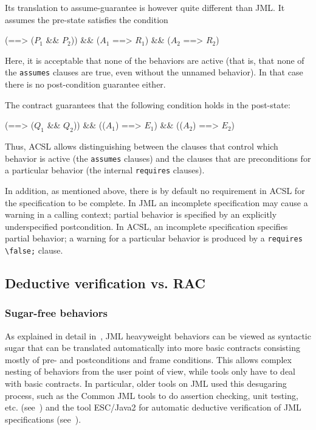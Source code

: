 \noindent
Its translation to assume-guarantee is however quite different than JML.
It assumes the pre-state satisfies the condition

\begin{listing-nonumber}
  (\true ==> ($P_1$ && $P_2$)) && ($A_1$ ==> $R_1$) && ($A_2$ ==> $R_2$)
\end{listing-nonumber}
Here, it is acceptable that none of the behaviors are active (that is, that none of the \lstinline|assumes| clauses are true, even without the unnamed behavior). In that case there is no post-condition guarantee either.

The contract guarantees that the following condition holds in the post-state:

\begin{listing-nonumber}
(\true ==> ($Q_1$ && $Q_2$)) && (\old($A_1$) ==> $E_1$) && (\old($A_2$) ==> $E_2$)
\end{listing-nonumber}

Thus, ACSL allows distinguishing between the clauses that control
which behavior is active (the \lstinline|assumes| clauses) and the
clauses that are preconditions for a particular behavior (the internal
\lstinline|requires| clauses). 

In addition, as mentioned above, there is
by default no requirement in ACSL for the specification to be complete. In JML an incomplete specification may cause a warning in a calling context; partial behavior is specified by an explicitly underspecified postcondition. In ACSL, an incomplete specification specifies partial behavior; a warning for a particular behavior is produced by a \lstinline|requires \false;| clause.

\subsection{Deductive verification vs. RAC}

\subsubsection*{Sugar-free behaviors}

As explained in detail in~\cite{raghavan00desugaring}, JML
heavyweight behaviors can be viewed as syntactic sugar that can be translated automatically into more basic
contracts consisting mostly of pre- and postconditions and frame
conditions.  This allows complex nesting of behaviors from the user
point of view, while tools only have to deal with basic contracts. In
particular, older tools on JML used this desugaring process, such as
the Common JML tools to do assertion checking, unit testing,
etc. (see~\cite{leavens00jml}) and the tool ESC/Java2 for
automatic deductive verification of JML specifications
(see~\cite{Kiniry-Cok05}).

